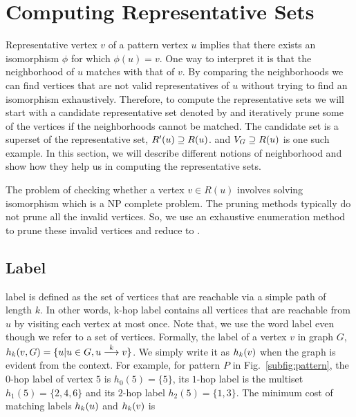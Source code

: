 
\section{Computing Representative Sets}
Representative vertex $v$ of a pattern vertex $u$ implies that there
exists an isomorphism $\phi$ for which $\phi(u) = v$.
 One way to interpret it is that the neighborhood of $u$ matches with
 that of $v$.  By comparing the neighborhoods we can find 
 vertices that are not valid representatives of $u$ without trying to
 find an isomorphism exhaustively. Therefore, to compute the
 representative sets we will start with a candidate 
 representative set denoted by \CR  and iteratively
 prune some of the vertices if the neighborhoods cannot be matched.
 The candidate set is a superset of the representative set, $\CR \supseteq \RS$.
 and $\vg \supseteq \RS$ is one such example.
  In this section, we will
 describe different notions of neighborhood and show how they
 help us in computing the representative
 sets.

The problem of checking whether a vertex $v \in R(u)$
 involves solving
 isomorphism which is a NP complete
 problem. The pruning methods typically
 do not prune all the invalid vertices. 
 So, we use an exhaustive enumeration method to prune these 
invalid vertices and reduce \CR to \RS.

 \subsection{\khop Label}
 \khop label 
 is defined as the set of vertices that are reachable via a simple
 path of length $k$. 
 In other words, k-hop label contains all vertices that are 
 reachable from $u$ by visiting each vertex at most once.
 Note that, we use the word label even though we refer to a set of vertices.
 Formally, the \khop label of a vertex
 $v$ in graph $G$, $\khopl{k}{v,G} = \{u | u \in G, \kpath{u}{v}{k}\}$.
 We simply write it as $\khopl{k}{v}$ when the graph is evident from
 the context. 
For example, for pattern $P$ in
Fig.~\ref{subfig:pattern}, the $0$-hop label of vertex $5$ is $h_0(5)
 = \{5\}$, its $1$-hop label is the multiset $h_1(5) = \{2, 4, 6\}$ 
 and its $2$-hop label $h_2(5) = \{1, 3\}$. The minimum 
 cost of matching \khop labels
 $\khopl{k}{u}$ and $\khopl{k}{v}$ is 


